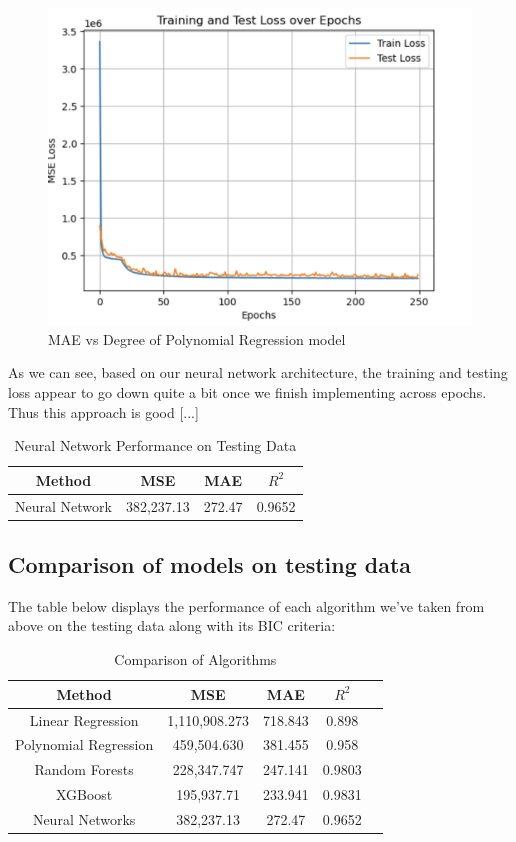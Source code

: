 \documentclass[conference]{IEEEtran}
\begin{document}
\begin{figure}[H]
    \centering
    \includegraphics[width=0.8\linewidth]{250.png} %
    \caption{MAE vs Degree of Polynomial Regression model}
    \label{fig:boxplots}
\end{figure}


As we can see, based on our neural network architecture, the training and testing loss appear to go down quite a bit once we finish implementing across epochs. Thus this approach is good [...]

\begin{table}[H]
\centering
\caption{Neural Network Performance on Testing Data}
\begin{tabular}{|c|c|c|c|}
\hline
Method & MSE & MAE & $R^2$ \\
\hline
Neural Network & 382,237.13 & 272.47 & 0.9652  \\
\hline
\end{tabular}
\label{tab:mytable}
\end{table}

\subsection{Comparison of models on testing data}

The table below displays the performance of each algorithm we've taken from above on the testing data along with its BIC criteria:

\begin{table}[H]
\centering
\caption{Comparison of Algorithms}
\begin{tabular}{|c|c|c|c|c|}
\hline
Method & MSE & MAE & $R^2$ \\
\hline
Linear Regression & 1,110,908.273 & 718.843 & 0.898 \\
\hline
Polynomial Regression & 459,504.630 & 381.455 &  0.958 \\
\hline
Random Forests & 228,347.747 & 247.141 & 0.9803  \\
\hline
XGBoost & 195,937.71 & 233.941 & 0.9831 \\
\hline
Neural Networks & 382,237.13 & 272.47 & 0.9652 \\
\hline
\end{tabular}
\label{tab:mytable}
\end{table}
\end{document}
